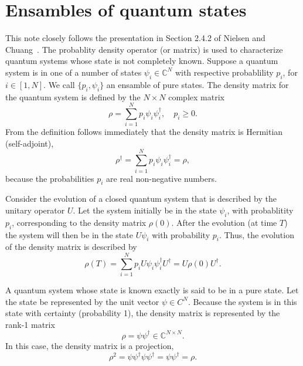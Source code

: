 \documentclass[11pt]{article}
\begin{document}



\section{Ensambles of quantum states}

This note closely follows the presentation in Section 2.4.2 of Nielsen and
Chuang~\cite{Nielsen-Chuang}.  The probablity density operator (or matrix) is used to characterize
quantum systems whose state is not completely known. Suppose a quantum system is in one of a number
of states $\psi_i\in{\mathbb C}^N$ with respective probablility $p_i$, for $i\in[1,N]$. We call
$\{p_i, \psi_i\}$ an ensamble of pure states. The density matrix for the quantum system is defined
by the $N\times N$ complex matrix
\[
\rho = \sum_{i=1}^N p_i \psi_i \psi_i^\dag,\quad p_i \geq 0.
\]
From the definition follows immediately that the density matrix is Hermitian (self-adjoint),
\[
\rho^\dag = \sum_{i=1}^N p_i \psi_i \psi_i^\dag = \rho,
\]
because the probabilities $p_i$ are real non-negative numbers.

Consider the evolution of a closed quantum system that is described by the unitary operator $U$. Let
the system initially be in the state $\psi_i$, with probablitity $p_i$, corresponding to the density
matrix $\rho(0)$. After the evolution (at time $T$) the system will then be in the state $U\psi_i$
with probability $p_i$. Thus, the evolution of the density matrix is described by
\[
\rho(T) = \sum_{i=1}^N p_i U \psi_i \psi_i^\dag U^\dag =  U \rho(0) U^\dag.
\]

A quantum system whose state is known exactly is said to be in a pure state. Let the state be
represented by the unit vector $\psi\in C^N$. Because the system is in this state with certainty
(probability 1), the density matrix is represented by the rank-1 matrix
\[
\rho = \psi \psi^\dag \in {\mathbb C}^{N\times N}.
\]
In this case, the density matrix is a projection,
\[
\rho^2 = \psi \psi^\dag \psi\psi^\dag = \psi\psi^\dag = \rho.
\]
\end{document}
